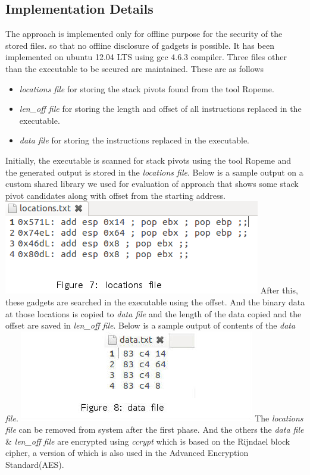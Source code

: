 \documentclass{article}
\begin{document}
\begin{multicols}{2}
	\subsection{Implementation Details}
	The approach is implemented only for offline purpose for the security of the stored files. so that no offline disclosure of gadgets is possible. It has been implemented on ubuntu 12.04 LTS using gcc 4.6.3 compiler. \break Three files other than the executable to be secured are maintained. These are as follows
	\begin{itemize}
		\item \textit{locations file} for storing the stack pivots found from the tool Ropeme\cite{ropeme}.
		\item \textit{len\_off file} for storing the length and offset of all instructions replaced in the executable.
		\item \textit{data file} for storing the instructions replaced in the executable.
	\end{itemize}
	Initially, the executable is scanned for stack pivots using the tool Ropeme\cite{ropeme} and the generated output is stored in the \textit{locations file}. Below is a sample output on a custom shared library we used for evaluation of approach that shows some stack pivot candidates along with offset from the starting address.\break \break
	\includegraphics[scale=.55]{locations.png}\break
	After this, these gadgets are searched in the executable using the offset. And the binary data at those locations is copied to \textit{data file} and the length of the data copied and the offset are saved in \textit{len\_off file}. Below is a sample output of contents of the \textit{data file}.\break \break
	\includegraphics[scale=.5]{data.jpg}\break
	The \textit{locations file} can be removed from system after the first phase. And the others the \textit{data file} \& \textit{len\_off file} are encrypted using \textit{ccrypt} which is based on the Rijndael block cipher, a version of which is also used in the Advanced Encryption Standard(AES).
	

\end{multicols}
\end{document}
